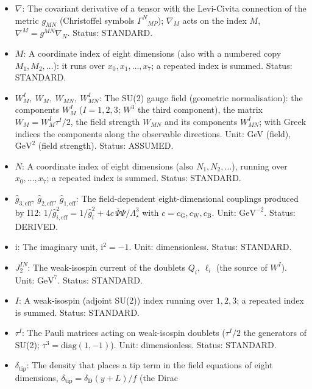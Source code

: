 \documentclass[
  10pt,
]{article}
\providecommand{\tightlist}{%
  \setlength{\itemsep}{0pt}\setlength{\parskip}{0pt}}
\begin{document}
\begin{itemize}
\tightlist
\item
  \(\nabla\): The covariant derivative of a tensor with the Levi-Civita
  connection of the metric \(g_{MN}\) (Christoffel symbols
  \(\Gamma^N{}_{MP}\)); \(\nabla_M\) acts on the index \(M\),
  \(\nabla^M = g^{MN}\nabla_N\). Status: STANDARD.
\item
  \(M\): A coordinate index of eight dimensions (also with a numbered
  copy \(M_1, M_2, \dots\)): it runs over \(x_0, x_1, \dots, x_7\); a
  repeated index is summed. Status: STANDARD.
\item
  \(W^I_M,\ W_M,\ W_{MN},\ W^I_{MN}\): The SU(2) gauge field (geometric
  normalisation): the components \(W^I_M\) (\(I = 1, 2, 3\); \(W^3\) the
  third component), the matrix \(W_M = W^I_M\tau^I/2\), the field
  strength \(W_{MN}\) and its components \(W^I_{MN}\); with Greek
  indices the components along the observable directions. Unit: GeV
  (field), \(\mathrm{GeV}^{2}\) (field strength). Status: ASSUMED.
\item
  \(N\): A coordinate index of eight dimensions (also
  \(N_1, N_2, \dots\)), running over \(x_0, \dots, x_7\); a repeated
  index is summed. Status: STANDARD.
\item
  \(\hat g_{3,\mathrm{eff}},\ \hat g_{2,\mathrm{eff}},\ \hat g_{1,\mathrm{eff}}\):
  The field-dependent eight-dimensional couplings produced by I12:
  \(1/\hat g_{i,\mathrm{eff}}^2 = 1/\hat g_i^2 + 4c\,\bar\Psi\Psi/\Lambda_\star^3\)
  with \(c = c_{\mathrm{G}}, c_{\mathrm{W}}, c_{\mathrm{B}}\). Unit:
  \(\mathrm{GeV}^{-2}\). Status: DERIVED.
\item
  \(\mathrm{i}\): The imaginary unit, \(\mathrm{i}^2 = -1\). Unit:
  dimensionless. Status: STANDARD.
\item
  \(J_2^{IN}\): The weak-isospin current of the doublets \(Q_i\),
  \(\ell_i\) (the source of \(W^I\)). Unit: \(\mathrm{GeV}^{7}\).
  Status: STANDARD.
\item
  \(I\): A weak-isospin (adjoint SU(2)) index running over \(1, 2, 3\);
  a repeated index is summed. Status: STANDARD.
\item
  \(\tau^I\): The Pauli matrices acting on weak-isospin doublets
  (\(\tau^I/2\) the generators of SU(2);
  \(\tau^3 = \mathrm{diag}(1, -1)\)). Unit: dimensionless. Status:
  STANDARD.
\item
  \(\delta_{\mathrm{tip}}\): The density that places a tip term in the
  field equations of eight dimensions,
  \(\delta_{\mathrm{tip}} = \delta_{\mathrm{D}}(y + L)/f\) (the Dirac

\end{itemize}
\end{document}

